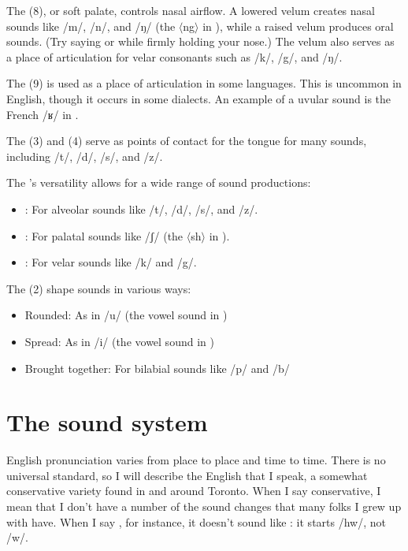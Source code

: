 The  (8), or soft palate, controls nasal airflow. A lowered velum creates nasal sounds like /m/, /n/, and /ŋ/ (the $\langle$ng$\rangle$ in ), while a raised velum produces oral sounds. (Try saying  or  while firmly holding your nose.) The velum also serves as a place of articulation for velar consonants such as /k/, /g/, and /ŋ/.

The  (9) is used as a place of articulation in some languages. This is uncommon in English, though it occurs in some dialects. An example of a uvular sound is the French /ʁ/ in .

The  (3) and  (4) serve as points of contact for the tongue for many sounds, including /t/, /d/, /s/, and /z/.

The 's versatility allows for a wide range of sound productions:
\begin{itemize}[noitemsep]
    \item {}: For alveolar sounds like /t/, /d/, /s/, and /z/.
    \item {}: For palatal sounds like /ʃ/ (the $\langle$sh$\rangle$ in ).
    \item {}: For velar sounds like /k/ and /g/.
\end{itemize}

The  (2) shape sounds in various ways:
\begin{itemize}[noitemsep]
    \item Rounded: As in /u/ (the vowel sound in )
    \item Spread: As in /i/ (the vowel sound in )
    \item Brought together: For bilabial sounds like /p/ and /b/
\end{itemize}


\section{The sound system}
English pronunciation varies from place to place and time to time. There is no universal standard, so I will describe the English that I speak, a somewhat conservative variety found in and around Toronto. When I say conservative, I mean that I don't have a number of the sound changes that many folks I grew up with have. When I say , for instance, it doesn't sound like : it starts /hw/, not /w/. 

